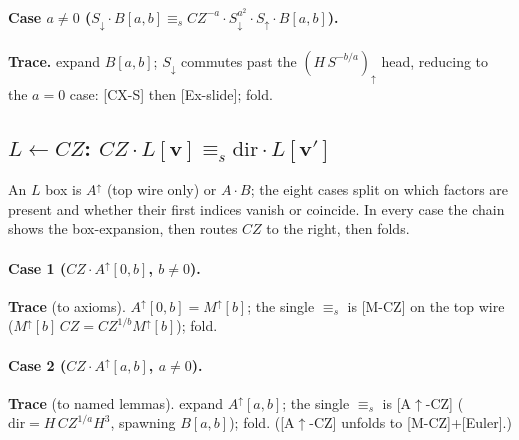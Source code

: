 \documentclass[a4paper]{article}
\newcommand{\lem}[1]{\textsf{[#1]}}      %
\begin{document}
\paragraph{Case $a\neq0$ \;($S_\downarrow\cdot B[a,b]\equiv_s CZ^{-a}\cdot S^{a^2}_\downarrow\cdot S_\uparrow\cdot B[a,b]$).}
\begin{center}\end{center}
\textbf{Trace.} expand $B[a,b]$; $S_\downarrow$ commutes past the $(H\,S^{-b/a})_\uparrow$ head, reducing to the $a=0$ case: \lem{CX-S} then \lem{Ex-slide}; fold.

\subsection{$L\leftarrow CZ$: \; $CZ\cdot L[\mathbf v]\equiv_s \mathrm{dir}\cdot L[\mathbf v']$}
\begin{center}\end{center}
An $L$ box is $A^{\uparrow}$ (top wire only) or $A\cdot B$; the eight cases split on which
factors are present and whether their first indices vanish or coincide. In every case the
chain shows the box-expansion, then routes $CZ$ to the right, then folds.

\paragraph{Case 1 \;($CZ\cdot A^{\uparrow}[0,b]$, $b\neq0$).}
\begin{center}\end{center}
\textbf{Trace} (to axioms). $A^{\uparrow}[0,b]=M^{\uparrow}[b]$; the single $\equiv_s$ is \lem{M-CZ} on the top wire ($M^{\uparrow}[b]\,CZ=CZ^{1/b}M^{\uparrow}[b]$); fold.

\paragraph{Case 2 \;($CZ\cdot A^{\uparrow}[a,b]$, $a\neq0$).}
\begin{center}\end{center}
\textbf{Trace} (to named lemmas). expand $A^{\uparrow}[a,b]$; the single $\equiv_s$ is \lem{A$\uparrow$-CZ} ($\mathrm{dir}=H\,CZ^{1/a}H^3$, spawning $B[a,b]$); fold. (\lem{A$\uparrow$-CZ} unfolds to \lem{M-CZ}+\lem{Euler}.)
\end{document}

